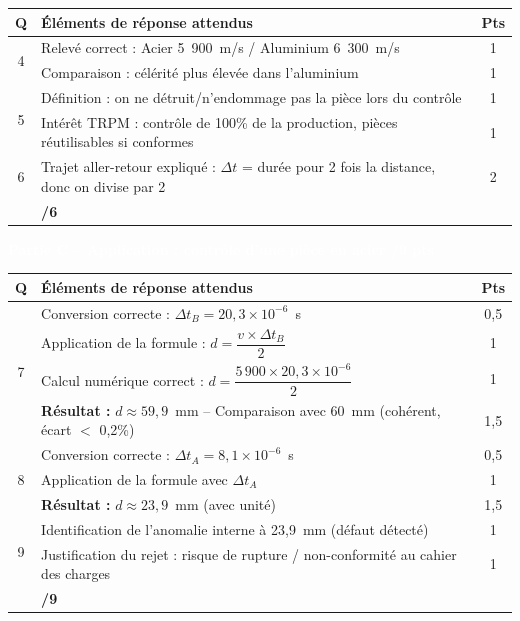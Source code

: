 \documentclass[10pt,a4paper]{article}
\newcommand{\exotitle}[2]{%
  \noindent\colorbox{exoheader}{%
    \parbox{\dimexpr\linewidth-2\fboxsep\relax}{%
      \textcolor{white}{\textbf{\large #1 \hfill #2}}%
    }%
  }%
}
\begin{document}
\begin{tabularx}{\linewidth}{|c|X|c|}
  \hline
  \rowcolor{exolight}
  \textbf{Q} & \textbf{Éléments de réponse attendus} & \textbf{Pts} \\
  \hline
  \multirow{2}{*}{4}
  & Relevé correct : Acier 5~900~m/s / Aluminium 6~300~m/s
  & 1 \\
  \cline{2-3}
  & Comparaison : célérité plus élevée dans l'aluminium
  & 1 \\
  \hline
  \multirow{2}{*}{5}
  & Définition : on ne détruit/n'endommage pas la pièce lors du contrôle
  & 1 \\
  \cline{2-3}
  & Intérêt TRPM : contrôle de 100\% de la production, pièces réutilisables si conformes
  & 1 \\
  \hline
  6
  & Trajet aller-retour expliqué : $\Delta t$ = durée pour 2 fois la distance, donc on divise par 2
  & 2 \\
  \hline
  \rowcolor{totalrow}
  \multicolumn{2}{|r|}{\textbf{Sous-total Partie B}} & \textbf{/6} \\
  \hline
\end{tabularx}

\vspace{4mm}

\exotitle{Partie C -- Application : contrôle d'une pièce en acier}{/9 pts}

\vspace{1mm}

\begin{tabularx}{\linewidth}{|c|X|c|}
  \hline
  \rowcolor{exolight}
  \textbf{Q} & \textbf{Éléments de réponse attendus} & \textbf{Pts} \\
  \hline
  \multirow{4}{*}{7}
  & Conversion correcte : $\Delta t_B = 20{,}3 \times 10^{-6}$~s
  & 0{,}5 \\
  \cline{2-3}
  & Application de la formule : $d = \dfrac{v \times \Delta t_B}{2}$
  & 1 \\
  \cline{2-3}
  & Calcul numérique correct : $d = \dfrac{5\,900 \times 20{,}3 \times 10^{-6}}{2}$
  & 1 \\
  \cline{2-3}
  & \textbf{Résultat :} $d \approx 59{,}9$~mm -- Comparaison avec 60~mm (cohérent, écart $<$ 0,2\%)
  & 1{,}5 \\
  \hline
  \multirow{3}{*}{8}
  & Conversion correcte : $\Delta t_A = 8{,}1 \times 10^{-6}$~s
  & 0{,}5 \\
  \cline{2-3}
  & Application de la formule avec $\Delta t_A$
  & 1 \\
  \cline{2-3}
  & \textbf{Résultat :} $d \approx 23{,}9$~mm (avec unité)
  & 1{,}5 \\
  \hline
  \multirow{2}{*}{9}
  & Identification de l'anomalie interne à 23,9~mm (défaut détecté)
  & 1 \\
  \cline{2-3}
  & Justification du rejet : risque de rupture / non-conformité au cahier des charges
  & 1 \\
  \hline
  \rowcolor{totalrow}
  \multicolumn{2}{|r|}{\textbf{Sous-total Partie C}} & \textbf{/9} \\
  \hline
\end{tabularx}
\end{document}
